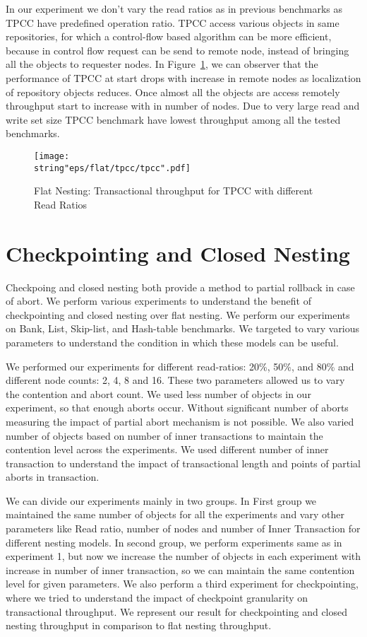\documentclass[12pt,english]{report}
\begin{document}
In our experiment we don't vary the read ratios as in previous benchmarks as TPCC have predefined operation ratio. TPCC access various objects in same repositories, for which a control-flow based algorithm can be more efficient, because in control flow request can be send to remote node, instead of bringing all the objects to requester nodes. In Figure~\ref{Fig:flatTPCC}, we can observer that the performance of TPCC at start drops with increase in remote nodes as localization of repository objects reduces. Once almost all the objects are access remotely throughput start to increase with in number of nodes. Due to very large read and write set size TPCC benchmark have lowest throughput among all the tested benchmarks.

\begin{figure}[H]
\centering
\texttt{[image: \\string"eps/flat/tpcc/tpcc".pdf]}
\caption{Flat Nesting: Transactional throughput for TPCC with different Read Ratios}
\label{Fig:flatTPCC}
\end{figure}

\section{Checkpointing and Closed Nesting}

Checkpoing and closed nesting both provide a method to partial rollback in case of abort. We perform various experiments to understand the benefit of checkpointing and closed nesting over flat nesting. We perform our experiments on Bank, List, Skip-list, and Hash-table benchmarks. We targeted to vary various parameters to understand the condition in which these models can be useful.

We performed our experiments for different read-ratios: 20\%, 50\%, and 80\% and different node counts: 2, 4, 8 and 16. These two parameters allowed us to vary the contention and abort count. We used less number of objects in our experiment, so that enough aborts occur. Without significant number of aborts measuring the impact of partial abort mechanism is not possible. We also varied number of objects based on number of inner transactions to maintain the contention level across the experiments. We used different number of inner transaction to understand the impact of transactional length and points of partial aborts in transaction.

We can divide our experiments mainly in two groups. In First group we maintained the same number of objects for all the experiments and vary other parameters like Read ratio, number of nodes and number of Inner Transaction for different nesting models. In second group, we perform experiments same as in experiment 1, but now we increase the number of objects in each experiment with increase in number of inner transaction, so we can maintain the same contention level for given parameters. We also perform a third experiment for checkpointing, where we tried to understand the impact of checkpoint granularity on transactional throughput. We represent our result for checkpointing and closed nesting throughput in comparison to flat nesting throughput.
\end{document}
